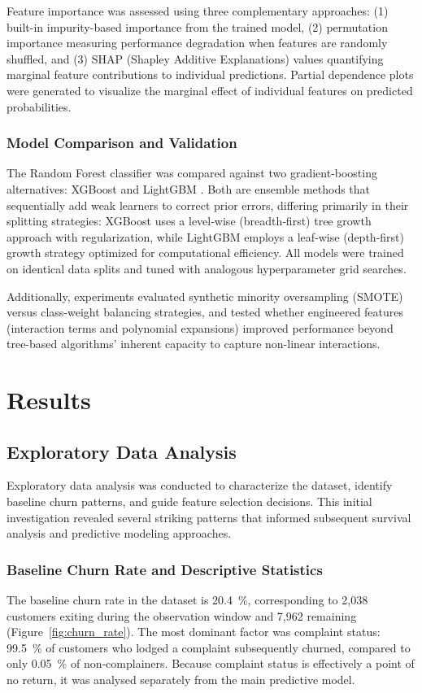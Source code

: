 \documentclass[12pt]{article}
\begin{document}
Feature importance was assessed using three complementary approaches: (1) built-in impurity-based importance from the trained model, (2) permutation importance measuring performance degradation when features are randomly shuffled, and (3) SHAP (Shapley Additive Explanations) values quantifying marginal feature contributions to individual predictions. Partial dependence plots were generated to visualize the marginal effect of individual features on predicted probabilities.

\subsubsection{Model Comparison and Validation}
The Random Forest classifier was compared against two gradient‑boosting alternatives: XGBoost \citep{Chen_2016} and LightGBM \citep{ke2017lightgbm}. Both are ensemble methods that sequentially add weak learners to correct prior errors, differing primarily in their splitting strategies: XGBoost uses a level‑wise (breadth‑first) tree growth approach with regularization, while LightGBM employs a leaf‑wise (depth‑first) growth strategy optimized for computational efficiency. All models were trained on identical data splits and tuned with analogous hyperparameter grid searches.

Additionally, experiments evaluated synthetic minority oversampling (SMOTE) versus class-weight balancing strategies, and tested whether engineered features (interaction terms and polynomial expansions) improved performance beyond tree-based algorithms' inherent capacity to capture non-linear interactions.

\section{Results}
\subsection{Exploratory Data Analysis}
Exploratory data analysis was conducted to characterize the dataset, identify baseline churn patterns, and guide feature selection decisions. This initial investigation revealed several striking patterns that informed subsequent survival analysis and predictive modeling approaches.

\subsubsection{Baseline Churn Rate and Descriptive Statistics}
The baseline churn rate in the dataset is 20.4~\%, corresponding to 2,038 customers exiting during the observation window and 7,962 remaining (Figure~\ref{fig:churn_rate}). The most dominant factor was complaint status: 99.5~\% of customers who lodged a complaint subsequently churned, compared to only 0.05~\% of non‑complainers. Because complaint status is effectively a point of no return, it was analysed separately from the main predictive model.
\end{document}
